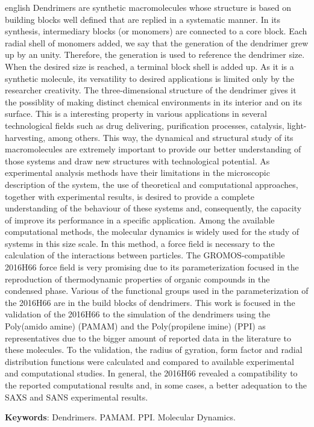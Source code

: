 \documentclass[
	12pt,				%
	openright,			%
	twoside,			%
	a4paper,			%
	english,			%
	french,				%
	spanish,			%
	brazil				%
	]{abntex2}
\begin{document}
\begin{resumo}[Abstract]
 \begin{otherlanguage*}{english}
Dendrimers are synthetic macromolecules whose structure is based on building blocks well defined that are replied in a systematic manner.
In its synthesis, intermediary blocks (or monomers) are connected to a core block.
Each radial shell of monomers added, we say that the generation of the dendrimer grew up by an unity.
Therefore, the generation is used to reference the dendrimer size.
When the desired size is reached, a terminal block shell is added up.
As it is a synthetic molecule, its versatility to desired applications is limited only by the researcher creativity.
The three-dimensional structure of the dendrimer gives it the possiblity of making distinct chemical environments in its interior and on its surface.
This is a interesting property in various applications in several technological fields such as drug delivering, purification processes, catalysis, light-harvesting, among others.
This way, the dynamical and structural study of its macromolecules are extremely important to provide our better understanding of those systems and draw new structures with technological potential.
As experimental analysis methods have their limitations in the microscopic description of the system, the use of theoretical and computational approaches, together with experimental results, is desired to provide a complete understanding of the behaviour of these systems and, consequently, the capacity of improve its performance in a specific application.
Among the available computational methods, the molecular dynamics is widely used for the study of systems in this size scale.
In this method, a force field is necessary to the calculation of the interactions between particles.
The GROMOS-compatible 2016H66 force field is very promising due to its parameterization focused in the reproduction of thermodynamic properties of organic compounds in the condensed phase.
Various of the functional groups used in the parameterization of the 2016H66 are in the build blocks of dendrimers.
This work is focused in the validation of the 2016H66 to the simulation of the dendrimers using the Poly(amido amine) (PAMAM) and the Poly(propilene imine) (PPI) as representatives due to the bigger amount of reported data in the literature to these molecules.
To the validation, the radius of gyration, form factor and radial distribution functions were calculated and compared to available experimental and computational studies. In general, the 2016H66 revealed a compatibility to the reported computational results and, in some cases, a better adequation to the SAXS and SANS experimental results.

   \vspace{\onelineskip}
 
   \noindent 
   \textbf{Keywords}: Dendrimers. PAMAM. PPI. Molecular Dynamics.
 \end{otherlanguage*}
\end{resumo}
\end{document}
